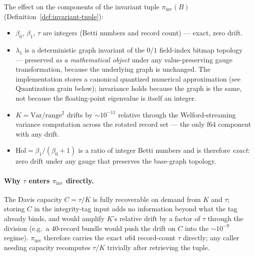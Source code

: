 \documentclass[11pt,letterpaper]{article}
\begin{document}
The effect on the components of the invariant tuple
$\pi_{\mathrm{inv}}(B)$ (Definition~\ref{def:invariant-tuple}):
\begin{itemize}[nosep]
\item $\beta_0$, $\beta_1$, $\tau$ are integers (Betti numbers and
  record count) --- exact, zero drift.
\item $\lambda_1$ is a deterministic graph invariant of the
  $0$/$1$ field-index bitmap topology --- preserved \emph{as a
  mathematical object} under any value-preserving gauge
  transformation, because the underlying graph is unchanged. The
  implementation stores a canonical quantized numerical
  approximation (see Quantization grain below); invariance holds
  because the graph is the same, not because the floating-point
  eigenvalue is itself an integer.
\item $K = \mathrm{Var}/\mathrm{range}^2$ drifts by $\sim 10^{-11}$
  relative through the Welford-streaming variance computation across
  the rotated record set --- the only f64 component with any drift.
\item $\overline{\mathrm{Hol}} = \beta_1 / (\beta_0 + 1)$ is a ratio
  of integer Betti numbers and is therefore \emph{exact}: zero
  drift under any gauge that preserves the base-graph topology.
\end{itemize}

\paragraph{Why $\tau$ enters $\pi_{\mathrm{inv}}$ directly.}
The Davis capacity $C = \tau / K$ is fully recoverable on demand
from $K$ and $\tau$; storing $C$ in the integrity-tag input adds
no information beyond what the tag already binds, and would
amplify $K$'s relative drift by a factor of $\tau$ through the
division (e.g.\ a $40$-record bundle would push the drift on $C$
into the $\sim 10^{-9}$ regime). $\pi_{\mathrm{inv}}$ therefore
carries the exact $u64$ record-count $\tau$ directly; any caller
needing capacity recomputes $\tau / K$ trivially after retrieving
the tuple.
\end{document}

